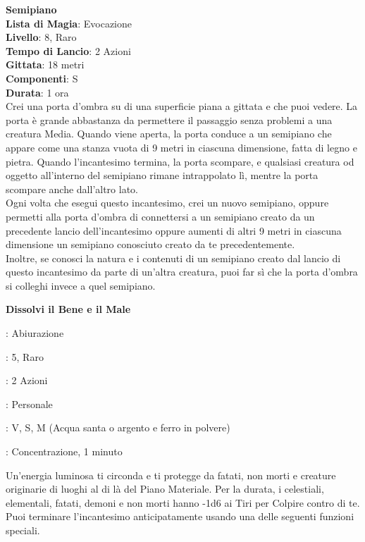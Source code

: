 \documentclass[a4paper,twoside,openany]{book}
\begin{document}
\begin{multicols}{2}
\medskip\textbf{Semipiano}\\
\textbf{Lista di Magia}: Evocazione\\
\textbf{Livello}: 8, Raro\\
\textbf{Tempo di Lancio}: 2 Azioni\\
\textbf{Gittata}: 18 metri\\
\textbf{Componenti}: S\\
\textbf{Durata}: 1 ora\\
Crei una porta d'ombra su di una superficie piana a gittata e che puoi vedere. La porta è grande abbastanza da permettere il passaggio senza problemi a una creatura Media. Quando viene aperta, la porta conduce a un semipiano che appare come una stanza vuota di 9 metri in ciascuna dimensione, fatta di legno e pietra. Quando l'incantesimo termina, la porta scompare, e qualsiasi creatura od oggetto all'interno del semipiano rimane intrappolato lì, mentre la porta scompare anche dall'altro lato.\\
Ogni volta che esegui questo incantesimo, crei un nuovo semipiano, oppure permetti alla porta d'ombra di connettersi a un semipiano creato da un precedente lancio dell'incantesimo oppure aumenti di altri 9 metri in ciascuna dimensione un semipiano conosciuto creato da te precedentemente. \\
Inoltre, se conosci la natura e i contenuti di un semipiano creato dal lancio di questo incantesimo da parte di un'altra creatura, puoi far sì che la porta d'ombra si colleghi invece a quel semipiano.

\medskip\textbf{Dissolvi il Bene e il Male}
\begin{description}[noitemsep, topsep=0pt, parsep=0pt, partopsep=0pt, leftmargin=0cm, labelwidth=2.8cm]
	\item[\textbf{Lista di Magia}]: Abiurazione
	\item[\textbf{Livello}]: 5, Raro
	\item[\textbf{T. di Lancio}]: 2 Azioni
	\item[\textbf{Gittata}]: Personale
	\item[\textbf{Componenti}]: V, S, M (Acqua santa o argento e ferro in polvere)
	\item[\textbf{Durata}]: Concentrazione, 1 minuto
\end{description}

Un'energia luminosa ti circonda e ti protegge da fatati, non morti e creature originarie di luoghi al di là del Piano Materiale. Per la durata, i celestiali, elementali, fatati, demoni e non morti hanno -1d6 ai Tiri per Colpire contro di te. Puoi terminare l'incantesimo anticipatamente usando una delle seguenti funzioni speciali.


\end{multicols}
\end{document}
